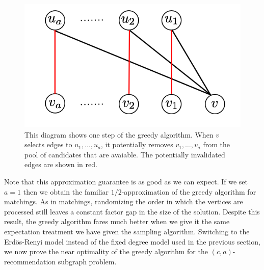 \begin{figure}[t]
\centering
\includegraphics[width=.4\textwidth]{images/greedy.png}
\begin{minipage}[h]{.8\linewidth}
\caption{This diagram shows one step of the greedy algorithm. When $v$ selects edges to $u_1,\ldots, u_a$, it potentially removes $v_1,\ldots, v_a$ from the pool of candidates that are avaiable. The potentially invalidated edges are shown in red.}
\end{minipage}
\end{figure}

Note that this approximation guarantee is as good as we can expect.
If we set $a=1$ then we obtain the familiar
$1/2$-approximation of the greedy algorithm for matchings. 
As in matchings, randomizing the order in
which the vertices are processed still leaves a constant factor gap
in the size of the solution\cite{KarpVaziraniVazirani1990}.
Despite this result, the greedy algorithm fares much better when we
give it the same expectation treatment we have given the sampling
algorithm. Switching to the Erd\"{o}s-Renyi model instead of the 
fixed degree model used in the previous section, we now prove the
near optimality of the greedy algorithm for the $(c, a)$-recommendation
subgraph problem.

